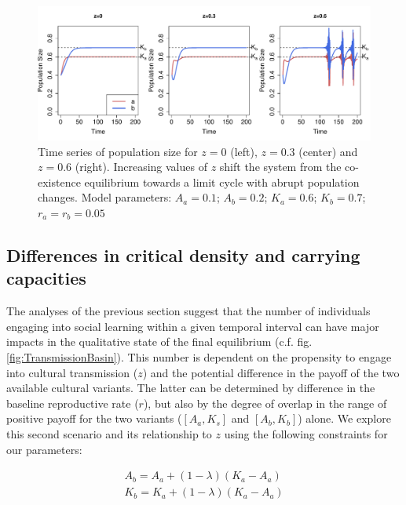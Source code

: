 \documentclass[review,authoryear]{elsarticle}
\begin{document}
\begin{figure}
  \centering
      \includegraphics[width=1\textwidth]{./figures/figure4b.pdf}
  \caption{Time series of population size for $z=0$ (left), $z=0.3$ (center) and $z=0.6$ (right). Increasing values of $z$ shift the system from the co-existence equilibrium towards a limit cycle with abrupt population changes. Model parameters: $A_a=0.1$; $A_b=0.2$; $K_a=0.6$; $K_b=0.7$; $r_a=r_b=0.05$}
    \label{fig:TSsocialLearning}
\end{figure}

\subsection{Differences in critical density and carrying capacities}

The analyses of the previous section suggest that the number of individuals engaging into social learning within a given temporal interval can have major impacts in the qualitative state of the final equilibrium (c.f. fig. \ref{fig:TransmissionBasin}). This number is dependent on the propensity to engage into cultural transmission ($z$) and the potential difference in the payoff of the two available cultural variants. The latter can be determined by difference in the baseline reproductive rate ($r$), but also by the degree of overlap in the range of positive payoff for the two variants ($[A_a,K_s]$ and $[A_b,K_b]$) alone. We explore this second scenario and its relationship to $z$ using the following constraints for our parameters:

\begin{equation}
\begin{aligned}
\label{eqOverlap}
A_b = A_a + (1-\lambda)(K_a-A_a)\\
K_b = K_a + (1-\lambda)(K_a-A_a)
\end{aligned}
\end{equation}
\end{document}
